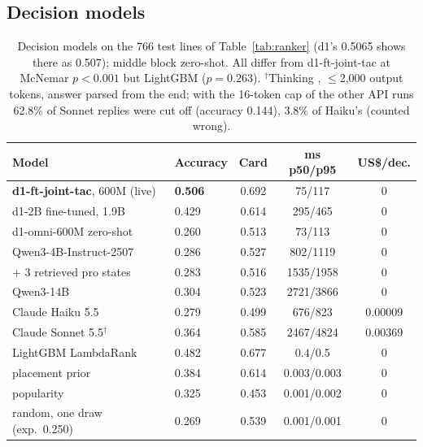 \subsection{Decision models}
\label{sec:decmodels}

\begin{table}[t]
\caption{Decision models on the 766 test lines of Table~\ref{tab:ranker} (d1's 0.5065 shows there as 0.507); middle block zero-shot. All differ from d1-ft-joint-tac at McNemar $p<0.001$ but LightGBM ($p=0.263$). $^\dagger$Thinking , $\le$2,000 output tokens, answer parsed from the end; with the 16-token cap of the other API runs 62.8\% of Sonnet replies were cut off (accuracy 0.144), 3.8\% of Haiku's (counted wrong).}
\label{tab:decmodels}
\centering\scriptsize
\setlength{\tabcolsep}{2.2pt}
\begin{tabular}{@{}llccc@{}}
\toprule
Model & Accuracy & Card & ms p50/p95 & US\$/dec.\\
\midrule
\textbf{d1-ft-joint-tac}, 600M (live) & \textbf{0.506} & 0.692 & 75/117 & 0\\
d1-2B fine-tuned, 1.9B & 0.429 & 0.614 & 295/465 & 0\\
\midrule
d1-omni-600M zero-shot & 0.260 & 0.513 & 73/113 & 0\\
Qwen3-4B-Instruct-2507 & 0.286 & 0.527 & 802/1119 & 0\\
\quad + 3 retrieved pro states & 0.283 & 0.516 & 1535/1958 & 0\\
Qwen3-14B & 0.304 & 0.523 & 2721/3866 & 0\\
Claude Haiku 5.5 & 0.279 & 0.499 & 676/823 & 0.00009\\
Claude Sonnet 5.5$^\dagger$ & 0.364 & 0.585 & 2467/4824 & 0.00369\\
\midrule
LightGBM LambdaRank & 0.482 & 0.677 & 0.4/0.5 & 0\\
placement prior & 0.384 & 0.614 & 0.003/0.003 & 0\\
popularity & 0.325 & 0.453 & 0.001/0.002 & 0\\
random, one draw (exp.\ 0.250) & 0.269 & 0.539 & 0.001/0.001 & 0\\
\bottomrule
\end{tabular}
\end{table}

